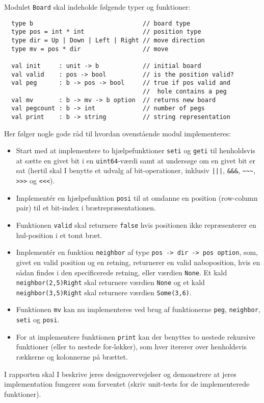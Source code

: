 Modulet \lstinline{Board} skal indeholde følgende typer og funktioner:
\begin{lstlisting}
  type b                              // board type
  type pos = int * int                // position type
  type dir = Up | Down | Left | Right // move direction
  type mv = pos * dir                 // move

  val init     : unit -> b            // initial board
  val valid    : pos -> bool          // is the position valid?
  val peg      : b -> pos -> bool     // true if pos valid and
                                      //  hole contains a peg
  val mv       : b -> mv -> b option  // returns new board
  val pegcount : b -> int             // number of pegs
  val print    : b -> string          // string representation
\end{lstlisting}

Her følger nogle gode råd til hvordan ovenstående modul implementeres:
\begin{itemize}

\item Start med at implementere to hjælpefunktioner \lstinline{seti} og \lstinline{geti} til henholdsvis at sætte en givet bit i en \lstinline{uint64}-værdi samt at undersøge om en givet bit er sat (hertil skal I benytte et udvalg af bit-operationer, inklusiv \lstinline{|||}, \lstinline{&&&}, \lstinline{~~~}, \lstinline{>>>} og \lstinline{<<<}).

\item Implementér en hjælpefunktion \lstinline{posi} til at omdanne en position (row-column pair) til et bit-index i brætrepræsentationen.

\item Funktionen \lstinline{valid} skal returnere \lstinline{false} hvis positionen ikke repræsenterer en hul-position i et tomt bræt.
\item Implementér en funktion \lstinline{neighbor} af type \lstinline{pos -> dir -> pos option}, som, givet en valid position og en retning, returnerer en valid naboposition, hvis en sådan findes i den specificerede retning, eller værdien \lstinline{None}. Et kald \lstinline{neighbor(2,5)Right} skal returnere værdien \lstinline{None} og et kald \lstinline{neighbor(3,5)Right} skal returnere værdien \lstinline{Some(3,6)}.
\item Funktionen \lstinline{mv} kan nu implementeres ved brug af funktionerne \lstinline{peg}, \lstinline{neighbor}, \lstinline{seti} og \lstinline{posi}.
\item For at implementere funktionen \lstinline{print} kan der benyttes to nestede rekursive funktioner (eller to nestede for-løkker), som hver itererer over henholdsvis rækkerne og kolonnerne på brættet.
\end{itemize}

I rapporten skal I beskrive jeres designovervejelser og demonstrere at jeres implementation fungerer som forventet (skriv unit-tests for de implementerede funktioner).
